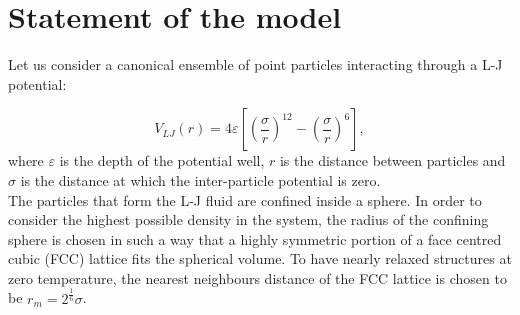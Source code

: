 \section{Statement of the model\label{chap:chap7_statement}}

Let us consider a canonical ensemble of point particles interacting through a L-J potential:

\begin{equation}
V_{LJ}\left(r\right)=4\varepsilon\left[\left(\frac{\sigma}{r}\right)^{12}-\left(\frac{\sigma}{r}\right)^{6}\right],\label{eq:sSH_eq}
\end{equation}
where $\varepsilon$ is the depth of the potential well, $r$ is the distance between particles and $\sigma$ is the distance at which the inter-particle potential is zero.\\
The particles that form the L-J fluid are confined inside a sphere. In order to consider the highest possible density in the system, the radius of the confining sphere is chosen in such a way that a highly symmetric portion of a face centred cubic (FCC) lattice fits the spherical volume. To have nearly relaxed structures at zero temperature, the nearest neighbours distance of the FCC lattice is chosen to be $r_{m}=2^{\frac{1}{6}}\sigma$.


